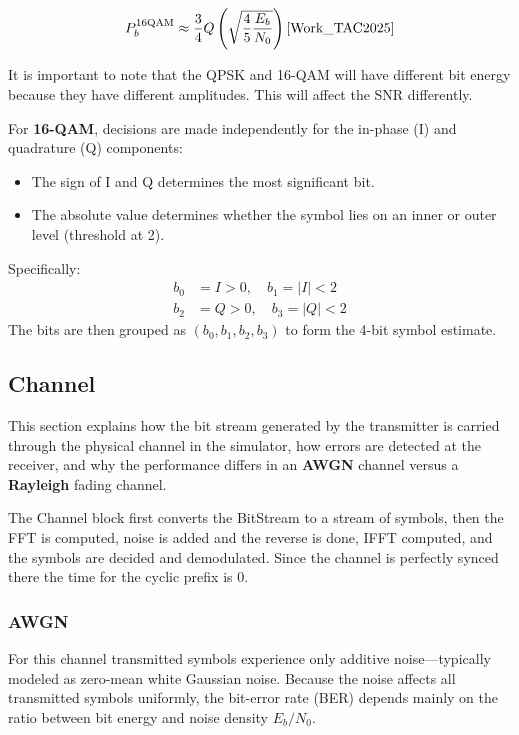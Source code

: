 \begin{equation}
  P_b^{\text{16QAM}} \approx \frac{3}{4}Q\left(\sqrt{\frac{4}{5}\frac{E_b}{N_0}}\right)\text{\cite{Work_TAC2025}}
  \label{eq:probErr16QAM}
\end{equation}

It is important to note that the QPSK and 16-QAM will have different bit energy because they have different amplitudes. This will affect the SNR differently.

For \textbf{16-QAM}, decisions are made independently for the in-phase (I) and quadrature (Q) components:
\begin{itemize}
  \item The sign of I and Q determines the most significant bit.
  \item The absolute value determines whether the symbol lies on an inner or outer level (threshold at 2).
\end{itemize}
Specifically:
\begin{align*}
  b_0 &= I > 0, \quad b_1 = |I| < 2 \\
  b_2 &= Q > 0, \quad b_3 = |Q| < 2
\end{align*}
The bits are then grouped as $(b_0, b_1, b_2, b_3)$ to form the 4-bit symbol estimate.

\subsection{Channel}

\label{sec:channel}

This section explains how the bit stream generated by the transmitter is carried through the physical channel in the simulator, how errors are detected at the receiver, and why the performance differs in an \textbf{AWGN} channel versus a \textbf{Rayleigh} fading channel.

The Channel block first converts the BitStream to a stream of symbols, then the FFT is computed, noise is added and the reverse is done, IFFT computed, and the symbols are decided and demodulated. Since the channel is perfectly synced there the time for the cyclic prefix is 0.

\subsubsection{AWGN}

For this channel transmitted symbols experience only additive noise—typically modeled as zero-mean white Gaussian noise. Because the noise affects all transmitted symbols uniformly, the bit-error rate (BER) depends mainly on the ratio between bit energy and noise density $E_b/N_{0}$. 

